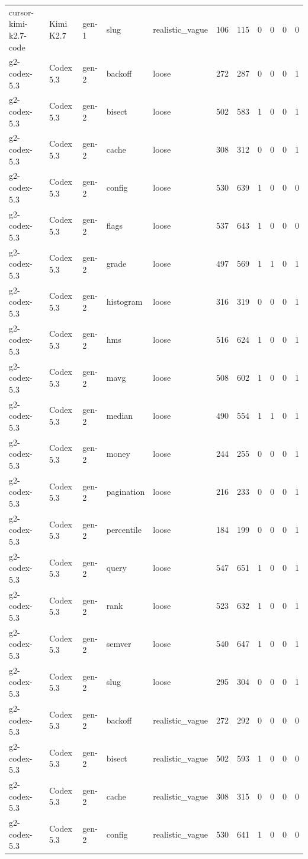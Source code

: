 \begin{tabular}{lllllllllll}
cursor-kimi-k2.7-code & Kimi K2.7 & gen-1 & slug & realistic\_vague & 106 & 115 & 0 & 0 & 0 & 0 \\
g2-codex-5.3 & Codex 5.3 & gen-2 & backoff & loose & 272 & 287 & 0 & 0 & 0 & 1 \\
g2-codex-5.3 & Codex 5.3 & gen-2 & bisect & loose & 502 & 583 & 1 & 0 & 0 & 1 \\
g2-codex-5.3 & Codex 5.3 & gen-2 & cache & loose & 308 & 312 & 0 & 0 & 0 & 1 \\
g2-codex-5.3 & Codex 5.3 & gen-2 & config & loose & 530 & 639 & 1 & 0 & 0 & 0 \\
g2-codex-5.3 & Codex 5.3 & gen-2 & flags & loose & 537 & 643 & 1 & 0 & 0 & 0 \\
g2-codex-5.3 & Codex 5.3 & gen-2 & grade & loose & 497 & 569 & 1 & 1 & 0 & 1 \\
g2-codex-5.3 & Codex 5.3 & gen-2 & histogram & loose & 316 & 319 & 0 & 0 & 0 & 1 \\
g2-codex-5.3 & Codex 5.3 & gen-2 & hms & loose & 516 & 624 & 1 & 0 & 0 & 1 \\
g2-codex-5.3 & Codex 5.3 & gen-2 & mavg & loose & 508 & 602 & 1 & 0 & 0 & 1 \\
g2-codex-5.3 & Codex 5.3 & gen-2 & median & loose & 490 & 554 & 1 & 1 & 0 & 1 \\
g2-codex-5.3 & Codex 5.3 & gen-2 & money & loose & 244 & 255 & 0 & 0 & 0 & 1 \\
g2-codex-5.3 & Codex 5.3 & gen-2 & pagination & loose & 216 & 233 & 0 & 0 & 0 & 1 \\
g2-codex-5.3 & Codex 5.3 & gen-2 & percentile & loose & 184 & 199 & 0 & 0 & 0 & 1 \\
g2-codex-5.3 & Codex 5.3 & gen-2 & query & loose & 547 & 651 & 1 & 0 & 0 & 1 \\
g2-codex-5.3 & Codex 5.3 & gen-2 & rank & loose & 523 & 632 & 1 & 0 & 0 & 1 \\
g2-codex-5.3 & Codex 5.3 & gen-2 & semver & loose & 540 & 647 & 1 & 0 & 0 & 1 \\
g2-codex-5.3 & Codex 5.3 & gen-2 & slug & loose & 295 & 304 & 0 & 0 & 0 & 1 \\
g2-codex-5.3 & Codex 5.3 & gen-2 & backoff & realistic\_vague & 272 & 292 & 0 & 0 & 0 & 0 \\
g2-codex-5.3 & Codex 5.3 & gen-2 & bisect & realistic\_vague & 502 & 593 & 1 & 0 & 0 & 0 \\
g2-codex-5.3 & Codex 5.3 & gen-2 & cache & realistic\_vague & 308 & 315 & 0 & 0 & 0 & 0 \\
g2-codex-5.3 & Codex 5.3 & gen-2 & config & realistic\_vague & 530 & 641 & 1 & 0 & 0 & 0 \\

\end{tabular}
